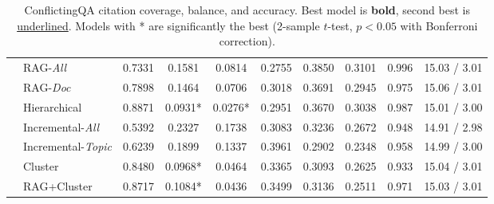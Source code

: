 \begin{table*}[!h]
\begin{tabular}{@{}clcccccccc@{}}
 & \multicolumn{1}{l|}{RAG-\textit{All}} & 0.7331 & 0.1581 & \multicolumn{1}{c|}{0.0814} & 0.2755 & 0.3850 & \multicolumn{1}{c|}{0.3101} & 0.996 & 15.03 / 3.01 \\
 & \multicolumn{1}{l|}{RAG-\textit{Doc}} & 0.7898 & 0.1464 & \multicolumn{1}{c|}{0.0706} & 0.3018 & 0.3691 & \multicolumn{1}{c|}{0.2945} & 0.975 & 15.06 / 3.01 \\
 & \multicolumn{1}{l|}{Hierarchical} & 0.8871 & 0.0931* & \multicolumn{1}{c|}{0.0276*} & 0.2951 & 0.3670 & \multicolumn{1}{c|}{0.3038} & 0.987 & 15.01 / 3.00 \\
 & \multicolumn{1}{l|}{Incremental-\textit{All}} & 0.5392 & 0.2327 & \multicolumn{1}{c|}{0.1738} & 0.3083 & 0.3236 & \multicolumn{1}{c|}{0.2672} & 0.948 & 14.91 / 2.98 \\
 & \multicolumn{1}{l|}{Incremental-\textit{Topic}} & 0.6239 & 0.1899 & \multicolumn{1}{c|}{0.1337} & 0.3961 & 0.2902 & \multicolumn{1}{c|}{0.2348} & 0.958 & 14.99 / 3.00 \\
 & \multicolumn{1}{l|}{Cluster} & 0.8480 & 0.0968* & \multicolumn{1}{c|}{0.0464} & 0.3365 & 0.3093 & \multicolumn{1}{c|}{0.2625} & 0.933 & 15.04 / 3.01 \\
 & \multicolumn{1}{l|}{RAG+Cluster} & 0.8717 & 0.1084* & \multicolumn{1}{c|}{0.0436} & 0.3499 & 0.3136 & \multicolumn{1}{c|}{0.2511} & 0.971 & 15.03 / 3.01 \\ \bottomrule
\end{tabular}
\caption{\label{table:doc_cover_cqa_all}ConflictingQA citation coverage, balance, and accuracy. Best model is \textbf{bold}, second best is \underline{underlined}. Models with * are significantly the best (2-sample $t$-test, $p<0.05$ with Bonferroni correction).}
\end{table*}

